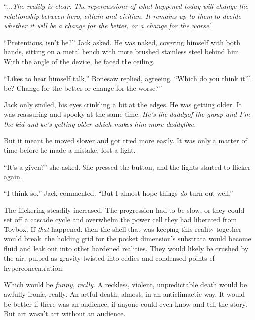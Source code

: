 








``.\emph{..The reality is clear.  The repercussions of what happened today will change the relationship between hero, villain and civilian.  It remains up to them to decide whether it will be a change for the better, or a change for the worse}.''



``Pretentious, isn't he?'' Jack asked.  He was naked, covering himself with both hands, sitting on a metal bench with more brushed stainless steel behind him.  With the angle of the device, he faced the ceiling.



``Likes to hear himself talk,'' Bonesaw replied, agreeing.  ``Which do you think it'll be?  Change for the better or change for the worse?''



Jack only smiled, his eyes crinkling a bit at the edges.  He was getting older.  It was reassuring and spooky at the same time.  \emph{He's the daddy}\emph{of the group and I'm the kid and he's getting older which makes him more daddylike.}



But it meant he moved slower and got tired more easily.  It was only a matter of time before he made a mistake, lost a fight.



``It's a given?'' she asked.  She pressed the button, and the lights started to flicker again.



``I think so,'' Jack commented.  ``But I almost hope things \emph{do} turn out well.''



The flickering steadily increased.  The progression had to be slow, or they could set off a cascade cycle and overwhelm the power cell they had liberated from Toybox.  If \emph{that} happened, then the shell that was keeping this reality together would break, the holding grid for the pocket dimension's substrata would become fluid and leak out into other hardened realities.  They would likely be crushed by the air, pulped as gravity twisted into eddies and condensed points of hyperconcentration.



Which would be \emph{funny, really}.  A reckless, violent, unpredictable death would be awfully ironic, really.  An artful death, almost, in an anticlimactic way.  It would be better if there was an audience, if anyone could even know and tell the story.  But art wasn't art without an audience.



